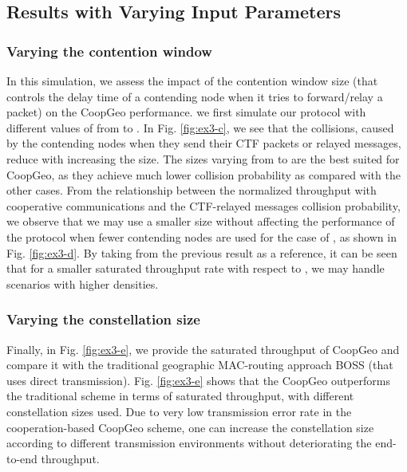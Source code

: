 \documentclass[journal,twoside,final]{IEEEtran}
\begin{document}
\subsection{Results with Varying Input Parameters}
\subsubsection{Varying the contention window }
In this simulation, we assess the impact of the contention window size  (that controls the delay time of a contending node when it tries to forward/relay a packet) on the CoopGeo performance. we first simulate our protocol with different values of  from  to . In Fig. \ref{fig:ex3-c}, we see that the collisions, caused by the contending nodes when they send their CTF packets or relayed messages, reduce with increasing the  size.  The sizes varying from  to  are the best suited for CoopGeo, as they achieve much lower collision probability as compared with the other cases. From the relationship between the normalized throughput with cooperative communications and the CTF-relayed messages collision probability, we observe that we may use a smaller  size without affecting the performance of the protocol when fewer contending nodes are used for the case of , as shown in Fig. \ref{fig:ex3-d}. By taking  from the previous result as a reference, it can be seen that for a smaller saturated throughput rate with respect to , we may handle scenarios with higher densities.

\subsubsection{Varying the constellation size}
Finally, in Fig. \ref{fig:ex3-e}, we provide the saturated throughput of CoopGeo and compare it with the traditional geographic MAC-routing approach BOSS (that uses direct transmission). Fig. \ref{fig:ex3-e} shows that the CoopGeo outperforms the traditional scheme in terms of saturated throughput, with different constellation sizes used. Due to very low transmission error rate in the cooperation-based CoopGeo scheme, one can increase the constellation size according to different transmission environments without deteriorating the end-to-end throughput.
\end{document}
